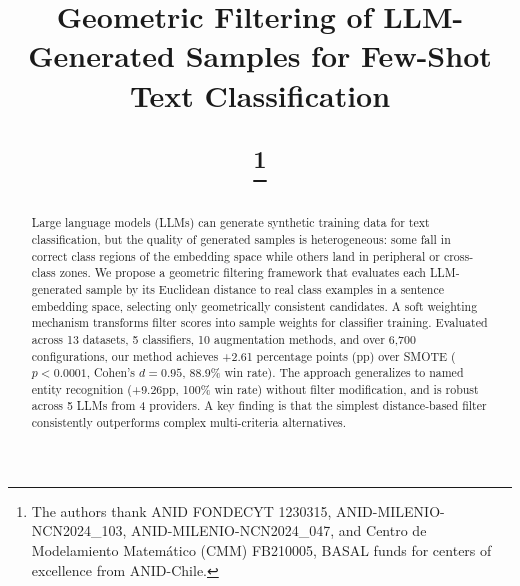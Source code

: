 \documentclass[conference]{IEEEtran}
\begin{document}
\title{Geometric Filtering of LLM-Generated Samples for Few-Shot Text Classification

\thanks{The authors thank ANID FONDECYT 1230315, ANID-MILENIO-NCN2024\_103, ANID-MILENIO-NCN2024\_047, and Centro de Modelamiento Matemático (CMM) FB210005, BASAL funds for centers of excellence from ANID-Chile.}

}

\author{
\and
{}
}

\maketitle

\thispagestyle{plain}


\begin{abstract}
Large language models (LLMs) can generate synthetic training data for text classification, but the quality of generated samples is heterogeneous: some fall in correct class regions of the embedding space while others land in peripheral or cross-class zones. We propose a geometric filtering framework that evaluates each LLM-generated sample by its Euclidean distance to real class examples in a sentence embedding space, selecting only geometrically consistent candidates. A soft weighting mechanism transforms filter scores into sample weights for classifier training. Evaluated across 13 datasets, 5 classifiers, 10 augmentation methods, and over 6,700 configurations, our method achieves +2.61 percentage points (pp) over SMOTE ($p<0.0001$, Cohen's $d=0.95$, 88.9\% win rate). The approach generalizes to named entity recognition (+9.26pp, 100\% win rate) without filter modification, and is robust across 5 LLMs from 4 providers. A key finding is that the simplest distance-based filter consistently outperforms complex multi-criteria alternatives.
\end{abstract}
\end{document}
